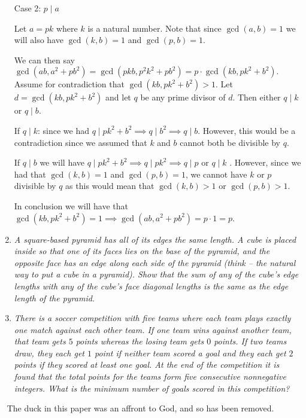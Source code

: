 \documentclass{article}
\begin{document}
\begin{enumerate}[1.]
Case 2: $p \mid a$ \par
Let $a = pk$ where $k$ is a natural number. Note that since $\gcd(a, b) = 1$ we will also have $\gcd(k, b) = 1$ and $\gcd(p, b) = 1.$ \par
We can then say $\gcd(ab, a^2+pb^2) = \gcd(pkb, p^2k^2 + pb^2) = p\cdot \gcd(kb, pk^2 + b^2).$ Assume for contradiction that $\gcd(kb, pk^2 + b^2) > 1$. Let $d = \gcd(kb, pk^2 + b^2)$ and let $q$ be any prime divisor of $d$. Then either $q \mid k$ or $q \mid b$. \par
If $q \mid k$: since we had $q \mid pk^2 + b^2 \implies q \mid b^2 \implies q \mid b$. However, this would be a contradiction since we assumed that $k$ and $b$ cannot both be divisible by $q$. \par
If $q \mid b$ we will have  $q \mid pk^2 + b^2 \implies q \mid pk^2 \implies q \mid p$ or $q \mid k$ . However, since we had that $\gcd(k, b) = 1$ and $\gcd(p, b) = 1$, we cannot have $k$ or $p$ divisible by $q$ as this would mean that $\gcd(k, b) > 1$ or $\gcd(p, b) > 1$. \par
In conclusion we will have that $\gcd(kb, pk^2 + b^2) = 1 \implies \gcd(ab, a^2+pb^2) = p\cdot 1 = p$.


\item %
{\itshape A square-based pyramid has all of its edges the same length.
A cube is placed inside so that one of its faces lies on the base of the pyramid, and the opposite face has an edge along each side of the pyramid (think -- the natural way to put a cube in a pyramid).
Show that the sum of any of the cube's edge lengths with any of the cube's face diagonal lengths is the same as the edge length of the pyramid.}


\item %
{\itshape There is a soccer competition with five teams where each team plays exactly one match against each other team.
If one team wins against another team, that team gets $5$ points whereas the losing team gets $0$ points.
If two teams draw, they each get $1$ point if neither team scored a goal and they each get $2$ points if they scored at least one goal.
At the end of the competition it is found that the total points for the teams form five consecutive nonnegative integers.
What is the minimum number of goals scored in this competition?}

\end{enumerate}


\clearpage
~
\vfill
\centering
The duck in this paper was an affront to God, and so has been removed.
\vfill
\end{document}
